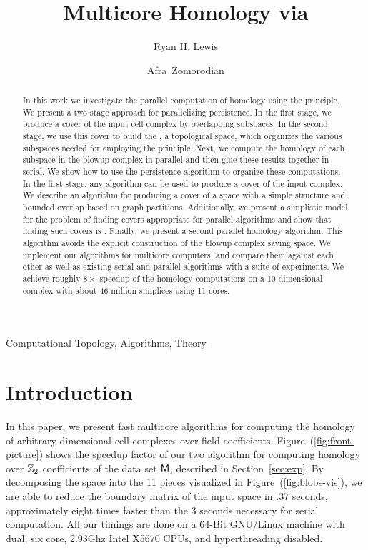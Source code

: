 \documentclass{elsarticle}
\title{Multicore Homology via \mv{}}
\begin{document}
\DRAFT
\begin{frontmatter}
 \author{Ryan H. Lewis}
 \address{Institute for Computational Mathematics and Engineering, Huang Building, Stanford University}
  
\author{Afra~Zomorodian}
 \address{The D. E. Shaw Group, 1166 Avenue of the Americas, Ninth Floor, New York, New York}
 
\begin{abstract}
In this work we investigate the parallel computation of homology using the \mv principle. We present a 
two stage approach for parallelizing persistence. In the first stage, we produce a cover of the input cell complex by overlapping subspaces.
In the second stage, we use this cover to build the \mvb{}, a topological space, which organizes the various subspaces needed for employing the \mv principle. 
Next, we compute the homology of each subspace in the blowup complex in parallel and then glue these results together in serial. 
We show how to use the persistence algorithm to organize these computations.
In the first stage, any algorithm can be used to produce a cover of the input complex. We describe an algorithm for producing a cover of a space with a simple structure and 
bounded overlap based on graph partitions. Additionally, we present a simplistic model for the problem of finding covers appropriate for parallel algorithms and show that finding such covers is \NPH{}.  
Finally, we present a second parallel homology algorithm. This algorithm avoids the explicit construction of the blowup complex saving space. 
We implement our algorithms for multicore computers, and compare them against each other as well as existing serial and parallel algorithms with a suite of experiments. 
We achieve roughly $8 \times$ speedup of the homology computations on a 10-dimensional complex with about 46 million simplices using 11 cores.
\end{abstract}
\begin{keyword}
Computational Topology, Algorithms, Theory
\end{keyword}
\end{frontmatter}
\section{Introduction}

In this paper, we present fast multicore algorithms for computing
the homology of arbitrary dimensional cell complexes over field
coefficients. Figure~(\ref{fig:front-picture}) shows the speedup factor
of our two algorithm for computing homology over $\mathbb{Z}_2$ coefficients
of the data set $\textsf{M}$, described in Section~\ref{sec:exp}. By decomposing the
space into the 11 pieces visualized in Figure~(\ref{fig:blobs-vis}),
we are able to reduce the boundary matrix of the input space in 
.37 seconds, approximately eight times faster than the 3 seconds 
necessary for serial computation.
All our timings are done on a 64-Bit GNU/Linux machine with dual, six core, 
2.93Ghz Intel X5670 CPUs, and hyperthreading disabled.
\end{document}
